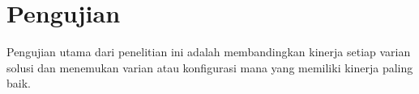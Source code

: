 \section{Pengujian}
\label{sec:pengujian}

Pengujian utama dari penelitian ini adalah membandingkan kinerja setiap varian solusi dan menemukan varian atau konfigurasi mana yang memiliki kinerja paling baik.














